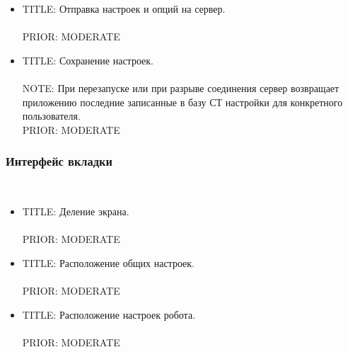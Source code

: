       \begin{itemize}

        \item{
          TITLE: Отправка настроек и опций на сервер.\\
          \\
          PRIOR: MODERATE\\
          }

        \item{
          TITLE: Сохранение настроек.\\
          \\
          NOTE: При перезапуске или при разрыве соединения сервер возвращает приложению последние записанные в базу СТ настройки для конкретного пользователя.\\
          PRIOR: MODERATE\\
          }

      \end{itemize}

    \subsubsection{Интерфейс вкладки} \mbox{}\\

      \begin{itemize}

        \item{
          TITLE: Деление экрана.\\
          \\          
          PRIOR: MODERATE\\}

        \item {
          TITLE: Расположение общих настроек.\\
          \\
          PRIOR: MODERATE\\}

        \item {
          TITLE: Расположение настроек робота.\\
          \\
          PRIOR: MODERATE\\}

      \end{itemize}

